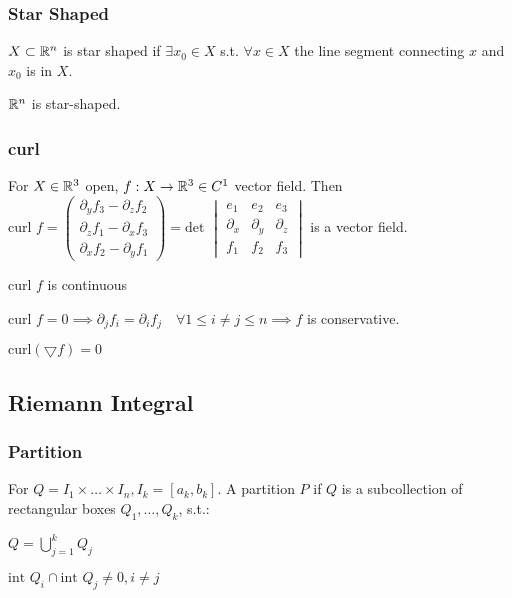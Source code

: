 \subsubsection{Star Shaped}
$X \subset \mathbb{R}^n$ is star shaped if $\exists x_0 \in X$ s.t. $\forall x \in X$ the line segment connecting $x$ and $x_0$ is in $X$.

\begin{compactitem}
    \item $\mathbb{R}^n$ is star-shaped.
\end{compactitem}

\subsubsection{curl}
For $X \in \mathbb{R}^3$ open, $f: X \to \mathbb{R}^3 \in C^1$ vector field. Then $\text{curl } f =
\begin{pmatrix}
    \partial_y f_3 - \partial_z f_2\\
    \partial_z f_1 - \partial_x f_3\\
    \partial_x f_2 - \partial_y f_1
\end{pmatrix} = \text{det }
\begin{vmatrix}
    e_1 & e_2 & e_3\\
    \partial_x & \partial_y & \partial_z\\
    f_1 & f_2 & f_3
\end{vmatrix}$ is a vector field.

\begin{compactitem}
    \item $\text{curl } f$ is continuous
    \item $\text{curl } f = 0 \implies \partial_j f_i = \partial_i f_j \quad \forall 1 \le i \neq j \le n \implies f$ is conservative.
    \item $\text{curl}(\bigtriangledown f) = 0$

\end{compactitem}

\subsection{Riemann Integral}

\subsubsection{Partition}
For $Q = I_1 \times \dots \times I_n, I_k = [a_k, b_k]$. A partition $P$ if $Q$ is a subcollection of rectangular boxes $Q_1, \dots , Q_k$, s.t.:
\begin{inparaitem}
    \item $Q = \bigcup_{j = 1}^k Q_j$
    \item $\text{int } Q_i \cap \text{int }Q_j \neq 0, i \neq j$
\end{inparaitem}

